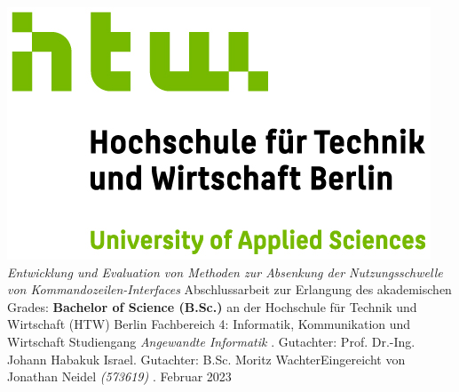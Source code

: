 \documentclass[oneside,bibliography=totocnumbered,BCOR=5mm]{scrbook}
\begin{document}
\begin{titlepage}
\begin{center}
\includegraphics{htw-logo.jpg}
\linebreak[4]
\linebreak[4]
\linebreak[4]
\linebreak[4]
\textit{\large Entwicklung und Evaluation von Methoden zur Absenkung der Nutzungsschwelle von Kommandozeilen-Interfaces}
\linebreak[4]
\linebreak[4]
\linebreak[4]
Abschlussarbeit
\linebreak[4]
\linebreak[4]
zur Erlangung des akademischen Grades:
\linebreak[4]
\linebreak[4]
\textbf{Bachelor of Science (B.Sc.)}
\linebreak[4]
\linebreak[4]
an der
\linebreak[4]
\linebreak[4]
Hochschule f\"ur Technik und Wirtschaft (HTW) Berlin
\linebreak[4]
Fachbereich 4: Informatik, Kommunikation und Wirtschaft
\linebreak[4]
Studiengang \textit{Angewandte Informatik}
\linebreak[4]
\linebreak[4]
. Gutachter: Prof. Dr.-Ing. Johann Habakuk Israel. Gutachter: B.Sc. Moritz Wachter\linebreak[4]
\linebreak[4]
\linebreak[4]
\linebreak[4]
\linebreak[4]
Eingereicht von Jonathan Neidel \textit{(573619)}
\linebreak[4]
\linebreak[4]
\linebreak[4]
. Februar 2023

\end{center}
\end{titlepage}
\newpage
\end{document}
